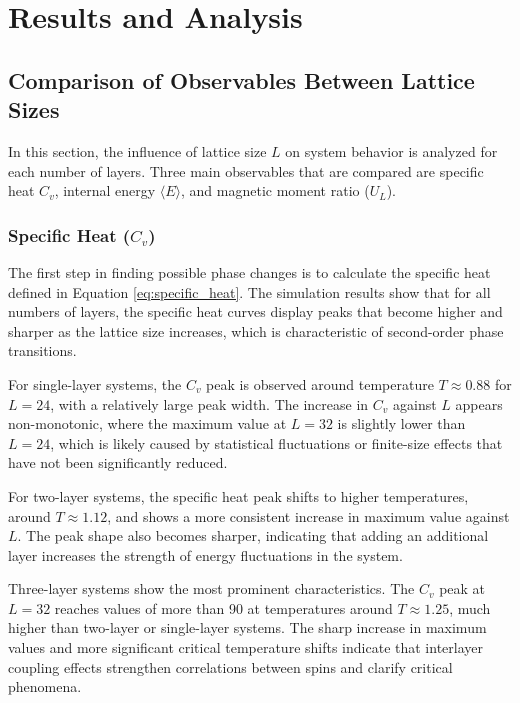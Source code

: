 \section{Results and Analysis}

\subsection{Comparison of Observables Between Lattice Sizes}

In this section, the influence of lattice size $L$ on system behavior is analyzed for each number of layers. Three main observables that are compared are specific heat $C_v$, internal energy $\langle E \rangle$, and magnetic moment ratio ($U_L$).

\subsubsection{Specific Heat ($C_v$)}

The first step in finding possible phase changes is to calculate the specific heat defined in Equation \ref{eq:specific_heat}. The simulation results show that for all numbers of layers, the specific heat curves display peaks that become higher and sharper as the lattice size increases, which is characteristic of second-order phase transitions.

For single-layer systems, the $C_v$ peak is observed around temperature $T \approx 0.88$ for $L = 24$, with a relatively large peak width. The increase in $C_v$ against $L$ appears non-monotonic, where the maximum value at $L = 32$ is slightly lower than $L = 24$, which is likely caused by statistical fluctuations or finite-size effects that have not been significantly reduced.

For two-layer systems, the specific heat peak shifts to higher temperatures, around $T \approx 1.12$, and shows a more consistent increase in maximum value against $L$. The peak shape also becomes sharper, indicating that adding an additional layer increases the strength of energy fluctuations in the system.

Three-layer systems show the most prominent characteristics. The $C_v$ peak at $L = 32$ reaches values of more than 90 at temperatures around $T \approx 1.25$, much higher than two-layer or single-layer systems. The sharp increase in maximum values and more significant critical temperature shifts indicate that interlayer coupling effects strengthen correlations between spins and clarify critical phenomena.

